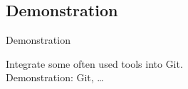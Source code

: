 \documentclass{beamer}
\begin{document}
\subsection{Demonstration}

\begin{frame}{Demonstration}{}

	Integrate some often used tools into Git. \\[5mm]

	Demonstration: Git, \dots

\end{frame}

\end{document}
